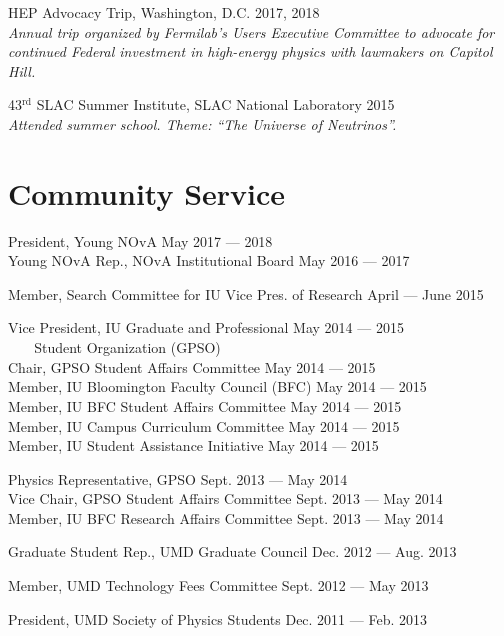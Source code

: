 \documentclass[11pt]{cv}
\begin{document}
\begin{cv}
HEP Advocacy Trip, Washington, D.C. \hfill 2017, 2018 \\
\emph{Annual trip organized by Fermilab's Users Executive Committee to advocate for continued Federal investment in high-energy physics with lawmakers on Capitol Hill.}

43$^{\text{rd}}$ SLAC Summer Institute, SLAC National Laboratory \hfill 2015 \\
\emph{Attended summer school. Theme: ``The Universe of Neutrinos''.}


\section{Community Service}

President, Young NOvA \hfill May 2017 --- 2018 \\
Young NOvA Rep., NOvA Institutional Board \hfill May 2016 --- 2017

Member, Search Committee for IU Vice Pres. of Research \hfill April --- June 2015

Vice President, IU Graduate and Professional \hfill May 2014 --- 2015 \\
\verb!   ! Student Organization (GPSO) \\
Chair, GPSO Student Affairs Committee \hfill May 2014 --- 2015 \\
Member, IU Bloomington Faculty Council (BFC) \hfill May 2014 --- 2015 \\
Member, IU BFC Student Affairs Committee \hfill May 2014 --- 2015 \\
Member, IU Campus Curriculum Committee \hfill May 2014 --- 2015 \\
Member, IU Student Assistance Initiative \hfill May 2014 --- 2015

Physics Representative, GPSO \hfill Sept. 2013 --- May 2014 \\
Vice Chair, GPSO Student Affairs Committee \hfill Sept. 2013 --- May 2014 \\
Member, IU BFC Research Affairs Committee \hfill Sept. 2013 --- May 2014

Graduate Student Rep., UMD Graduate Council \hfill Dec. 2012 --- Aug. 2013

Member, UMD Technology Fees Committee \hfill Sept. 2012 --- May 2013

President, UMD Society of Physics Students \hfill Dec. 2011 --- Feb. 2013


\end{cv}
\end{document}
